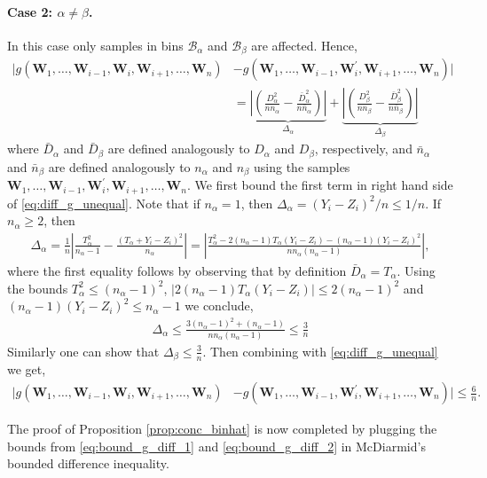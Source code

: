 \documentclass[11pt]{article}
\numberwithin{equation}{section}
\theoremstyle{definition}
\newcommand{\cB}{\mathcal{B}}
\newcommand{\bW}{\bm{W}}
\begin{document}
\paragraph{Case 2: $\alpha\neq \beta$.} In this case only samples in bins $\cB_\alpha$ and $\cB_\beta$ are affected. Hence,
\begin{align}\label{eq:diff_g_unequal}
    \big|g(\bW_1,\ldots, \bW_{i-1}, \bW_i,\bW_{i+1}, \ldots, \bW_n) 
    & - g(\bW_1,\ldots, \bW_{i-1}, \bW_i^\prime,\bW_{i+1}, \ldots, \bW_n)\big|\nonumber\\
    & = \underbrace{\left|\left(\frac{D_\alpha^2}{nn_\alpha} - \frac{\bar D_\alpha^2}{n\bar n_\alpha}\right)\right|}_{\Delta_\alpha} + \underbrace{\left|\left(\frac{D_\beta^2}{nn_\beta} - \frac{\bar D_\beta^2}{n\bar n_\beta}\right)\right|}_{\Delta_\beta}
\end{align}
where $\bar D_{\alpha}$ and $\bar D_{\beta}$ are defined analogously to $D_\alpha$ and $D_\beta$, respectively, and $\bar n_\alpha$ and $\bar n_\beta$ are defined analogously to $n_\alpha$ and $n_\beta$ using the samples $\bW_1,\ldots, \bW_{i-1}, \bW_i^\prime,\bW_{i+1}, \ldots, \bW_n$. We first bound the first term in right hand side of \eqref{eq:diff_g_unequal}. Note that if $n_\alpha = 1$, then $\Delta_\alpha = (Y_i - Z_i)^2/n\leq 1/n$. If $n_\alpha\geq 2$, then
\begin{align*}
    \Delta_\alpha = \frac{1}{n}\left|\frac{T_\alpha^2}{n_\alpha-1} - \frac{(T_\alpha + Y_i-Z_i)^2}{n_\alpha}\right| = \left|\frac{T_\alpha^2 - 2(n_\alpha-1)T_\alpha(Y_i-Z_i) - (n_\alpha-1)(Y_i-Z_i)^2}{nn_\alpha(n_\alpha-1)}\right|,
\end{align*}
where the first equality follows by observing that by definition $\bar D_\alpha = T_\alpha$. Using the bounds $T_\alpha^2\leq (n_\alpha-1)^2$, $|2(n_\alpha-1)T_\alpha(Y_i-Z_i)|\leq 2(n_\alpha-1)^2$ and $(n_\alpha-1)(Y_i-Z_i)^2\leq n_\alpha-1$ we conclude,
\begin{align*}
    \Delta_\alpha \leq \frac{3(n_\alpha-1)^2 + (n_\alpha-1)}{nn_\alpha(n_\alpha-1)}\leq \frac{3}{n}
\end{align*}
Similarly one can show that $\Delta_\beta\leq \frac{3}{n}$. Then combining with \eqref{eq:diff_g_unequal} we get,
\begin{align}\label{eq:bound_g_diff_2}
    \big|g(\bW_1,\ldots, \bW_{i-1}, \bW_i,\bW_{i+1}, \ldots, \bW_n) 
    & - g(\bW_1,\ldots, \bW_{i-1}, \bW_i^\prime,\bW_{i+1}, \ldots, \bW_n)\big|\leq \frac{6}{n}.
\end{align}

The proof of Proposition \ref{prop:conc_binhat} is now completed by plugging the bounds from \eqref{eq:bound_g_diff_1} and \eqref{eq:bound_g_diff_2} in McDiarmid's bounded difference inequality. 
\end{document}
